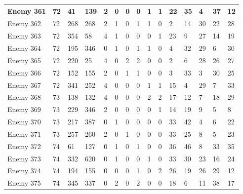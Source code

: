 \begin{sidewaystable}[!h]
{\begin{tabular}{|l|l|l|l|l|l|l|l|l|l|l|l|l|l|l|}
			Enemy 361 & 72 & 41 & 139 & 2 & 0 & 0 & 0 & 1 & 1 & 22 & 35 & 4 & 37 & 12 \\ \hline
			Enemy 362 & 72 & 268 & 268 & 2 & 1 & 0 & 1 & 1 & 0 & 2 & 14 & 30 & 22 & 28 \\ \hline
			Enemy 363 & 72 & 354 & 58 & 4 & 1 & 0 & 0 & 0 & 1 & 23 & 9 & 27 & 14 & 19 \\ \hline
			Enemy 364 & 72 & 195 & 346 & 0 & 1 & 0 & 1 & 1 & 0 & 4 & 32 & 29 & 6 & 30 \\ \hline
			Enemy 365 & 72 & 220 & 25 & 4 & 0 & 2 & 2 & 0 & 0 & 2 & 6 & 28 & 26 & 27 \\ \hline
			Enemy 366 & 72 & 152 & 155 & 2 & 0 & 1 & 1 & 0 & 0 & 3 & 33 & 3 & 30 & 25 \\ \hline
			Enemy 367 & 72 & 341 & 252 & 4 & 0 & 0 & 0 & 1 & 1 & 15 & 4 & 29 & 7 & 33 \\ \hline
			Enemy 368 & 73 & 138 & 132 & 4 & 0 & 0 & 0 & 2 & 2 & 17 & 12 & 7 & 18 & 29 \\ \hline
			Enemy 369 & 73 & 229 & 346 & 2 & 0 & 0 & 0 & 0 & 1 & 14 & 19 & 9 & 5 & 8 \\ \hline
			Enemy 370 & 73 & 217 & 387 & 0 & 1 & 0 & 0 & 0 & 0 & 33 & 42 & 4 & 6 & 22 \\ \hline
			Enemy 371 & 73 & 257 & 260 & 2 & 0 & 1 & 0 & 0 & 0 & 33 & 25 & 8 & 5 & 23 \\ \hline
			Enemy 372 & 74 & 61 & 127 & 0 & 1 & 0 & 1 & 0 & 0 & 36 & 46 & 8 & 33 & 35 \\ \hline
			Enemy 373 & 74 & 332 & 620 & 0 & 1 & 0 & 0 & 1 & 0 & 33 & 30 & 23 & 16 & 24 \\ \hline
			Enemy 374 & 74 & 194 & 155 & 0 & 0 & 0 & 1 & 0 & 2 & 26 & 19 & 26 & 29 & 12 \\ \hline
			Enemy 375 & 74 & 345 & 337 & 0 & 2 & 0 & 2 & 0 & 0 & 18 & 6 & 11 & 38 & 17 \\ \hline
		\end{tabular}%
	}
\end{sidewaystable}
\clearpage


